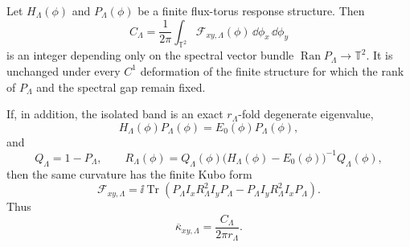 \begin{theorem}
\label{thm:finite-hall-curvature-theorem}
Let \(H_\Lambda(\phi)\) and \(P_\Lambda(\phi)\) be a finite flux-torus
response structure.  Then
\begin{equation}
  C_\Lambda
  =
  \frac{1}{2\pi}
  \int_{\mathbb T^2}\mathcal F_{xy,\Lambda}(\phi)\,
  \dd\phi_x\,\dd\phi_y
  \label{eq:finite-many-body-chern-number}
\end{equation}
is an integer depending only on the spectral vector bundle
\(\operatorname{Ran}P_\Lambda\to\mathbb T^2\).  It is unchanged under every
\(C^1\) deformation of the finite structure for which the rank of
\(P_\Lambda\) and the spectral gap remain fixed.

If, in addition, the isolated band is an exact \(r_\Lambda\)-fold degenerate
eigenvalue,
\[
  H_\Lambda(\phi)P_\Lambda(\phi)=E_0(\phi)P_\Lambda(\phi),
\]
and
\[
  Q_\Lambda=1-P_\Lambda,\qquad
  R_\Lambda(\phi)=
  Q_\Lambda(\phi)\bigl(H_\Lambda(\phi)-E_0(\phi)\bigr)^{-1}Q_\Lambda(\phi),
\]
then the same curvature has the finite Kubo form
\begin{equation}
  \mathcal F_{xy,\Lambda}
  =
  \ii\operatorname{Tr}\!\left(
    P_\Lambda I_x R_\Lambda^2 I_y P_\Lambda
    -
    P_\Lambda I_y R_\Lambda^2 I_x P_\Lambda
  \right).
  \label{eq:finite-hall-kubo-curvature}
\end{equation}
Thus
\[
  \overline\kappa_{xy,\Lambda}=\frac{C_\Lambda}{2\pi r_\Lambda}.
\]
\end{theorem}

